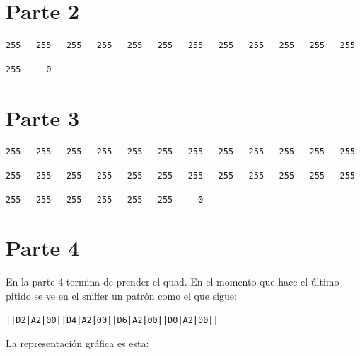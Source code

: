 \documentclass[spanish,12pt,a4paper,titlepage]{report}
\begin{document}
\section*{Parte 2}

\begin{verbatim}
255   255   255   255   255   255   255   255   255   255   255   255
\end{verbatim}
\begin{verbatim}
255     0
\end{verbatim}


\section*{Parte 3}

\begin{verbatim}
255   255   255   255   255   255   255   255   255   255   255   255
\end{verbatim}
\begin{verbatim}
255   255   255   255   255   255   255   255   255   255   255   255
\end{verbatim}
\begin{verbatim}
255   255   255   255   255   255     0
\end{verbatim}


\section*{Parte 4}

En la parte 4 termina de prender el quad. En el momento que hace el último pitido se ve en el sniffer un patrón como el que sigue:

\begin{verbatim}
||D2|A2|00||D4|A2|00||D6|A2|00||D0|A2|00||
\end{verbatim}

La representación gráfica es esta:
\end{document}
